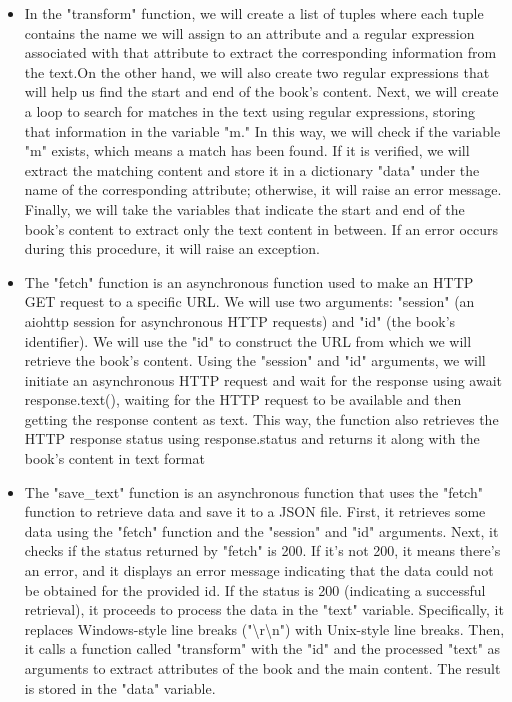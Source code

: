 \documentclass{article}
\begin{document}
\begin{itemize}
	\item In the "transform" function, we will create a list of tuples where each tuple contains the name we will assign to an attribute and a regular expression associated with that attribute to extract the corresponding information from the text.On the other hand, we will also create two regular expressions that will help us find the start and end of the book's content. Next, we will create a loop to search for matches in the text using regular expressions, storing that information in the variable "m." In this way, we will check if the variable "m" exists, which means a match has been found. If it is verified, we will extract the matching content and store it in a dictionary "data" under the name of the corresponding attribute; otherwise, it will raise an error message. Finally, we will take the variables that indicate the start and end of the book's content to extract only the text content in between. If an error occurs during this procedure, it will raise an exception.
	\item The "fetch" function is an asynchronous function used to make an HTTP GET request to a specific URL. We will use two arguments: "session" (an aiohttp session for asynchronous HTTP requests) and "id" (the book's identifier). We will use the "id" to construct the URL from which we will retrieve the book's content. Using the "session" and "id" arguments, we will initiate an asynchronous HTTP request and wait for the response using await response.text(), waiting for the HTTP request to be available and then getting the response content as text. This way, the function also retrieves the HTTP response status using response.status and returns it along with the book's content in text format
	\item The "save\_text" function is an asynchronous function that uses the "fetch" function to retrieve data and save it to a JSON file. First, it retrieves some data using the "fetch" function and the "session" and "id" arguments. Next, it checks if the status returned by "fetch" is 200. If it's not 200, it means there's an error, and it displays an error message indicating that the data could not be obtained for the provided id. If the status is 200 (indicating a successful retrieval), it proceeds to process the data in the "text" variable. Specifically, it replaces Windows-style line breaks ("{\textbackslash}r{\textbackslash}n") with Unix-style line breaks. Then, it calls a function called "transform" with the "id" and the processed "text" as arguments to extract attributes of the book and the main content. The result is stored in the "data" variable.

\end{itemize}
\end{document}
